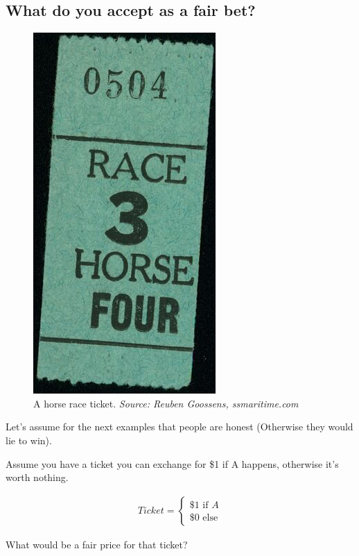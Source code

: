 \subsection{What do you accept as a fair bet?}
\begin{figure}[ht]
  \begin{center}
    \includegraphics[]{images/Oronsay-Rick-Danley-Horse-Race-ticket-June-30.jpg}
    \caption{A horse race ticket. \textit{Source: Reuben Goossens, ssmaritime.com}}
    \label{fig:raceticket}
  \end{center}
\end{figure}

Let's assume for the next examples that people are honest (Otherwise they would lie to win).

Assume you have a ticket you can exchange for \$1 if A happens, otherwise it's worth nothing.

\begin{align*}
Ticket = 
  \begin{cases}
    \$1 \mbox{ if } A \\
    \$0 \mbox{ else}
  \end{cases}
\end{align*}

What would be a fair price for that ticket?

